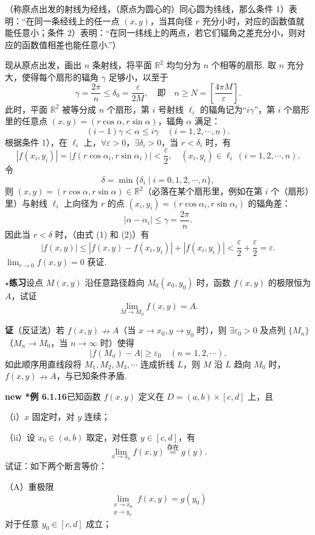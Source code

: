 \documentclass[UTF8, 12pt, fontset=fandol, oneside]{ctexart}
\begin{document}
（称原点出发的射线为经线，（原点为圆心的）同心圆为纬线，那么条件 1）表明：“在同一条经线上的任一点 $(x,y)$，当其向径 $r$ 充分小时，对应的函数值就能任意小；条件 2）表明：“在同一纬线上的两点，若它们辐角之差充分小，则对应的函数值相差也能任意小.”）

现从原点出发，画出 $n$ 条射线，将平面 $\mathbb{R}^2$ 均匀分为 $n$ 个相等的扇形. 取 $n$ 充分大，使得每个扇形的辐角 $\gamma$ 足够小，以至于
\[
  \gamma=\frac{2\pi}{n}\le\delta_0=\frac{\varepsilon}{2M},
  \quad\text{即}\quad n\ge N=\left[\frac{4\pi M}{\varepsilon}\right].
\]
此时，平面 $\mathbb{R}^2$ 被等分成 $n$ 个扇形，第 $i$ 号射线 $\ell_i$ 的辐角记为“$i\gamma$”，第 $i$ 个扇形里的任意点 $(x,y)=(r\cos\alpha,r\sin\alpha)$，辐角 $\alpha$ 满足：
\[
  (i-1)\gamma<\alpha\le i\gamma\quad (i=1,2,\cdots,n).
\]
根据条件 1），在 $\ell_i$ 上，$\forall\varepsilon>0$，$\exists\delta_i>0$，当 $r<\delta_i$ 时，有
\[
  |f(x_i,y_i)|=|f(r\cos\alpha_i,r\sin\alpha_i)|<\frac{\varepsilon}{2},
  \quad (x_i,y_i)\in\ell_i\ (i=1,2,\cdots,n).
\tag{2}
\]
令
\[
  \delta=\min\{\delta_i\mid i=0,1,2,\cdots,n\},
\]
则 $(x,y)=(r\cos\alpha,r\sin\alpha)\in\mathbb{R}^2$（必落在某个扇形里，例如在第 $i$ 个（扇形）里）与射线 $\ell_i$ 上向径为 $r$ 的点 $(x_i,y_i)=(r\cos\alpha_i,r\sin\alpha_i)$ 的辐角差：
\[
  |\alpha-\alpha_i|\le\gamma=\frac{2\pi}{n}.
\]
因此当 $r<\delta$ 时，（由式 (1) 和 (2)）有
\[
  |f(x,y)|\le |f(x,y)-f(x_i,y_i)|+|f(x_i,y_i)|
  <\frac{\varepsilon}{2}+\frac{\varepsilon}{2}=\varepsilon.
\]
$\displaystyle\lim_{r\to0}f(x,y)=0$ 获证.

\noindent\textbf{$\star$练习}\quad 设点 $M(x,y)$ 沿任意路径趋向 $M_0(x_0,y_0)$ 时，函数 $f(x,y)$ 的极限恒为 $A$，试证
\[
  \lim_{M\to M_0}f(x,y)=A.
\]

\noindent\textbf{证}\quad （反证法）若 $f(x,y)\nrightarrow A$（当 $x\to x_0,y\to y_0$ 时），则 $\exists\varepsilon_0>0$ 及点列 $\{M_n\}$（$M_n\to M_0$，当 $n\to\infty$ 时）使得
\[
  |f(M_n)-A|\ge\varepsilon_0\quad(n=1,2,\cdots).
\]
如此顺序用直线段将 $M_1,M_2,M_3,\cdots$ 连成折线 $L$，则 $M$ 沿 $L$ 趋向 $M_0$ 时，$f(x,y)\nrightarrow A$，与已知条件矛盾.

\noindent\textbf{new *例 6.1.16}\quad 已知函数 $f(x,y)$ 定义在 $D=(a,b)\times[c,d]$ 上，且

（i）$x$ 固定时，对 $y$ 连续；

（ii）设 $x_0\in(a,b)$ 取定，对任意 $y\in[c,d]$，有
\[
  \lim_{x\to x_0}f(x,y)\stackrel{\text{存在}}{=}g(y).
\]
试证：如下两个断言等价：

（A）重极限
\[
  \lim_{\substack{x\to x_0\\ y\to y_0}} f(x,y)=g(y_0)
\]
对于任意 $y_0\in[c,d]$ 成立；
\end{document}
